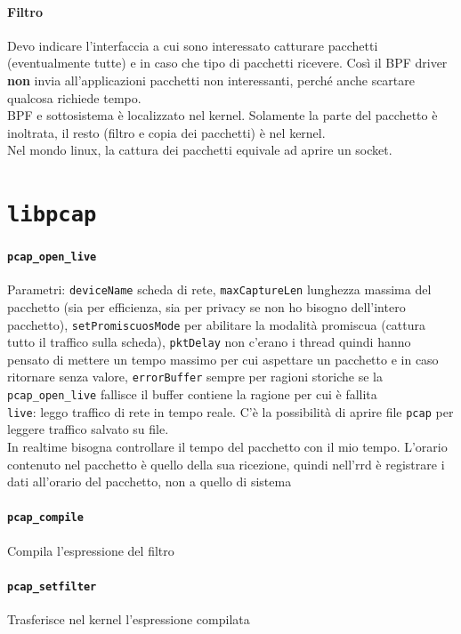 \documentclass[10pt]{book}
\begin{document}
\paragraph{Filtro} Devo indicare l'interfaccia a cui sono interessato catturare pacchetti (eventualmente tutte) e in caso che tipo di pacchetti ricevere. Così il BPF driver \textbf{non} invia all'applicazioni pacchetti non interessanti, perché anche scartare qualcosa richiede tempo.\\
BPF e sottosistema è localizzato nel kernel. Solamente la parte del pacchetto è inoltrata, il resto (filtro e copia dei pacchetti) è nel kernel.\\
Nel mondo linux, la cattura dei pacchetti equivale ad aprire un socket.
\section{\texttt{libpcap}}
\paragraph{\texttt{pcap\_open\_live}} Parametri: \texttt{deviceName} scheda di rete, \texttt{maxCaptureLen} lunghezza massima del pacchetto (sia per efficienza, sia per privacy se non ho bisogno dell'intero pacchetto), \texttt{setPromiscuosMode} per abilitare la modalità promiscua (cattura tutto il traffico sulla scheda), \texttt{pktDelay} non c'erano i thread quindi hanno pensato di mettere un tempo massimo per cui aspettare un pacchetto e in caso ritornare senza valore, \texttt{errorBuffer} sempre per ragioni storiche se la \texttt{pcap\_open\_live} fallisce il buffer contiene la ragione per cui è fallita\\
\texttt{live}: leggo traffico di rete in tempo reale. C'è la possibilità di aprire file \texttt{pcap} per leggere traffico salvato su file.\\
In realtime bisogna controllare il tempo del pacchetto con il mio tempo. L'orario contenuto nel pacchetto è quello della sua ricezione, quindi nell'rrd è registrare i dati all'orario del pacchetto, non a quello di sistema
\paragraph{\texttt{pcap\_compile}} Compila l'espressione del filtro
\paragraph{\texttt{pcap\_setfilter}} Trasferisce nel kernel l'espressione compilata
\end{document}
